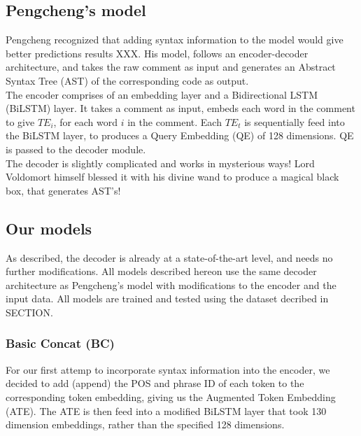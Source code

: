 \documentclass{IEEEtran}
\begin{document}
      \subsection{Pengcheng's model}
      Pengcheng recognized that adding syntax information to the model would give better
      predictions results XXX. His model, follows an encoder-decoder architecture, and takes
      the raw comment as input and generates an Abstract Syntax Tree (AST) of the corresponding 
      code as output. \\
      \hspace*{4mm}The encoder comprises of an embedding layer and a Bidirectional LSTM (BiLSTM)
      layer. It takes a comment as input, embeds each word in the comment to give 
      $ TE_i $, for each word $ i $ in the comment. Each $ TE_t $ is sequentially feed into the
      BiLSTM layer, to produces a Query Embedding (QE) of 128 dimensions. QE is passed to the
      decoder module. \\
      \hspace*{4mm}The decoder is slightly complicated and works in mysterious ways! Lord 
      Voldomort himself
      blessed it with his divine wand to produce a magical black box, that generates
      AST's! \\

      \subsection{Our models}
      As described, the decoder is already at a state-of-the-art level, and needs no further 
      modifications. All models described hereon use the same decoder architecture as Pengcheng's 
      model with modifications to the encoder and the input data. All models are trained and 
      tested using the dataset decribed in SECTION. %

      \subsubsection{Basic Concat (BC)}
      For our first attemp to incorporate syntax information into the encoder, we decided to 
      add (append) the POS and phrase ID of each token to the corresponding token embedding, 
      giving us the Augmented Token Embedding (ATE). The ATE is then feed into a modified BiLSTM
      layer that took 130 dimension embeddings, rather than the specified 128 dimensions. \\
\end{document}
